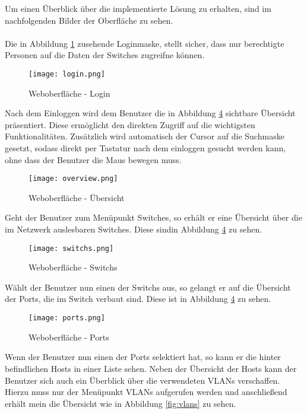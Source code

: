 \label{sec:impimgs}

Um einen Überblick über die implementierte Lösung zu erhalten, sind im nachfolgenden Bilder der Oberfläche zu sehen.\\\\
Die in Abbildung \ref{fig:login} zusehende Loginmaske, stellt sicher, dass nur berechtigte Personen auf die Daten der Switches zugreifne können.


\begin{figure}[H]
\centering
\texttt{[image: login.png]}
\caption[]{Weboberfläche - Login}
\label{fig:login}
\end{figure}

Nach dem Einloggen wird dem Benutzer die in Abbildung \ref{fig:overview} sichtbare Übersicht präsentiert.
Diese ermöglicht den direkten Zugriff auf die wichtigsten Funktionalitäten.
Zusätzlich wird automatisch der Cursor auf die Suchmaske gesetzt, sodass direkt per Tastatur nach dem einloggen gesucht werden kann, ohne dass der Benutzer die Maus bewegen muss.

\begin{figure}[H]
\centering
\texttt{[image: overview.png]}
\caption[]{Weboberfläche - Übersicht}
\label{fig:overview}
\end{figure}

Geht der Benutzer zum Menüpunkt Switches, so erhält er eine Übersicht über die im Netzwerk auslesbaren Switches.
Diese sindin Abbildung \ref{fig:overview} zu sehen.

\begin{figure}[H]
\centering
\texttt{[image: switchs.png]}
\caption[]{Weboberfläche - Switchs}
\label{fig:overview}
\end{figure}

Wählt der Benutzer nun einen der Switchs aus, so gelangt er auf die Übersicht der Ports, die im Switch verbaut sind.
Diese ist in Abbildung \ref{fig:overview} zu sehen.

\begin{figure}[H]
\centering
\texttt{[image: ports.png]}
\caption[]{Weboberfläche - Ports}
\label{fig:overview}
\end{figure}

Wenn der Benutzer nun einen der Ports selektiert hat, so kann er die hinter befindlichen Hosts in einer Liste sehen.
Neben der Übersicht der Hosts kann der Benutzer sich auch ein Überblick über die verwendeten VLANs verschaffen.
Hierzu muss nur der Menüpunkt VLANs aufgerufen werden und anschließend erhält mein die Übersicht wie in Abbildung \ref{fig:vlans} zu sehen.

